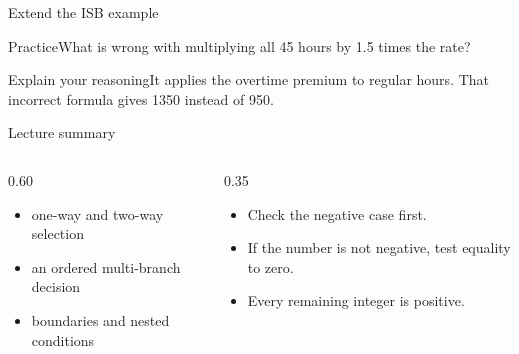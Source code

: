 \documentclass[10pt,aspectratio=169]{beamer}
\begin{document}
\begin{frame}[fragile,t]{Extend the ISB example}
\begin{alertblock}{Practice}What is wrong with multiplying all 45 hours by 1.5 times the rate?\end{alertblock}\vspace{3mm}\begin{exampleblock}{Explain your reasoning}It applies the overtime premium to regular hours. That incorrect formula gives 1350 instead of 950.\end{exampleblock}
\end{frame}
\begin{frame}[fragile,t]{Lecture summary}
\begin{columns}[T,onlytextwidth]\begin{column}{0.60\textwidth}
\begin{itemize}
\item one-way and two-way selection
\item an ordered multi-branch decision
\item boundaries and nested conditions
\end{itemize}
\end{column}\begin{column}{0.35\textwidth}\small
\begin{itemize}
\item Check the negative case first.
\item If the number is not negative, test equality to zero.
\item Every remaining integer is positive.
\end{itemize}
\end{column}\end{columns}
\end{frame}
\end{document}
